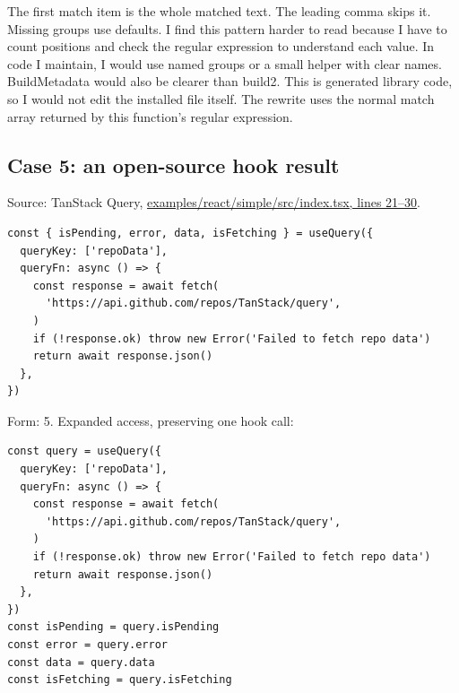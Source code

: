 \documentclass[
  10pt,
  a4paper,
]{article}
\begin{document}
The first match item is the whole matched text. The leading comma skips
it. Missing groups use defaults. I find this pattern harder to read
because I have to count positions and check the regular expression to
understand each value. In code I maintain, I would use named groups or a
small helper with clear names. BuildMetadata would also be clearer than
build2. This is generated library code, so I would not edit the
installed file itself. The rewrite uses the normal match array returned
by this function's regular expression.

\subsection{Case 5: an open-source hook
result}\label{case-5-an-open-source-hook-result}

Source: TanStack Query,
\href{https://github.com/TanStack/query/blob/36dd7927c85ce6cee37ab1eb3af25e7fc7ccbb14/examples/react/simple/src/index.tsx\#L21-L30}{examples/react/simple/src/index.tsx,
lines 21--30}.

\begin{minipage}{\linewidth}

\begin{lstlisting}
const { isPending, error, data, isFetching } = useQuery({
  queryKey: ['repoData'],
  queryFn: async () => {
    const response = await fetch(
      'https://api.github.com/repos/TanStack/query',
    )
    if (!response.ok) throw new Error('Failed to fetch repo data')
    return await response.json()
  },
})
\end{lstlisting}

\end{minipage}\par

Form: 5. Expanded access, preserving one hook call:

\begin{minipage}{\linewidth}

\begin{lstlisting}
const query = useQuery({
  queryKey: ['repoData'],
  queryFn: async () => {
    const response = await fetch(
      'https://api.github.com/repos/TanStack/query',
    )
    if (!response.ok) throw new Error('Failed to fetch repo data')
    return await response.json()
  },
})
const isPending = query.isPending
const error = query.error
const data = query.data
const isFetching = query.isFetching
\end{lstlisting}

\end{minipage}\par
\end{document}
